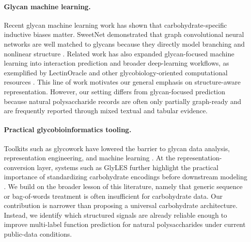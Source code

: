 \documentclass{article}
\begin{document}
\paragraph{Glycan machine learning.}
Recent glycan machine learning work has shown that carbohydrate-specific inductive biases matter. SweetNet demonstrated that graph convolutional neural networks are well matched to glycans because they directly model branching and nonlinear structure \cite{burkholz2021sweetnet}. Related work has also expanded glycan-focused machine learning into interaction prediction and broader deep-learning workflows, as exemplified by LectinOracle and other glycobiology-oriented computational resources \cite{lundstrom2022lectinoracle,bojar2021deeplearningresources}. This line of work motivates our general emphasis on structure-aware representation. However, our setting differs from glycan-focused prediction because natural polysaccharide records are often only partially graph-ready and are frequently reported through mixed textual and tabular evidence.

\paragraph{Practical glycobioinformatics tooling.}
Toolkits such as glycowork have lowered the barrier to glycan data analysis, representation engineering, and machine learning \cite{thomes2021glycowork}. At the representation-conversion layer, systems such as GlyLES further highlight the practical importance of standardizing carbohydrate encodings before downstream modeling \cite{joeres2023glyles}. We build on the broader lesson of this literature, namely that generic sequence or bag-of-words treatment is often insufficient for carbohydrate data. Our contribution is narrower than proposing a universal carbohydrate architecture. Instead, we identify which structured signals are already reliable enough to improve multi-label function prediction for natural polysaccharides under current public-data conditions.
\end{document}
